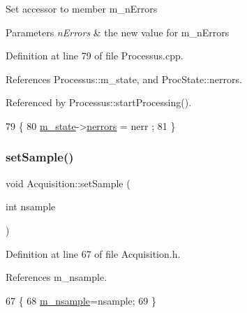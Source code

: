 Set accessor to member m\+\_\+n\+Errors 
\begin{DoxyParams}{Parameters}
{\em n\+Errors} & the new value for m\+\_\+n\+Errors \\
\hline
\end{DoxyParams}


Definition at line 79 of file Processus.\+cpp.



References Processus\+::m\+\_\+state, and Proc\+State\+::nerrors.



Referenced by Processus\+::start\+Processing().


\begin{DoxyCode}
79                                              \{
80   \hyperlink{classProcessus_ab3539eee42891ceae0baf4395ae7fb61}{m\_state}->\hyperlink{structProcState_a51a0f54ba62b07e07ac8518c5f32828d}{nerrors} = nerr ;
81 \}
\end{DoxyCode}
\mbox{\label{classAcquisition_ade6fd6483b3e3737fe7dcdffb5065954}} 
\subsubsection{\texorpdfstring{set\+Sample()}{setSample()}\hspace{0.1cm}{\footnotesize\ttfamily [1/2]}}
{\footnotesize\ttfamily void Acquisition\+::set\+Sample (\begin{DoxyParamCaption}\item[{int}]{nsample }\end{DoxyParamCaption})\hspace{0.3cm}{\ttfamily [inline]}}



Definition at line 67 of file Acquisition.\+h.



References m\+\_\+nsample.


\begin{DoxyCode}
67                              \{
68     \hyperlink{classAcquisition_a26d0f1a44309ffac49c365b7ee568ab2}{m\_nsample}=nsample;
69   \}
\end{DoxyCode}
\mbox{\label{classAcquisition_ade6fd6483b3e3737fe7dcdffb5065954}} 
